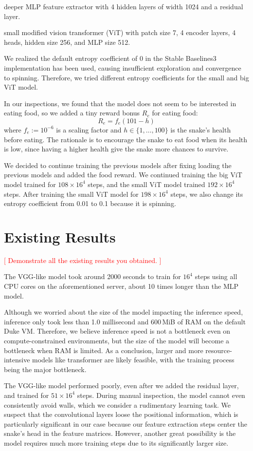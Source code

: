 \documentclass[a4paper]{article}
\newcommand{\todo}[1]{\textcolor{red}{[ #1 ]}}
\begin{document}
deeper MLP feature extractor with 4 hidden layers of width 1024 and a residual
layer.

small modified vision transformer (ViT) with patch size 7, 4 encoder layers,
4 heads, hidden size 256, and MLP size 512.

We realized the default entropy coefficient of 0 in the Stable Baselines3
implementation has been used,
causing insufficient exploration and convergence to spinning. Therefore,
we tried different entropy coefficients for the small and big ViT model.

In our inspections,
we found that the model does not seem to be interested in eating food,
so we added a tiny reward bonus $R_e$ for eating food:
$$
    R_e = f_e(101 - h)
$$
where $f_e:=10^{-6}$ is a scaling factor and $h\in\{1,\ldots,100\}$ is the
snake's health before eating.
The rationale is to encourage the snake to eat food when its health is low,
since having a higher health give the snake more chances to survive.

We decided to continue training the previous models after fixing loading the
previous models and added the food reward.
We continued training the big ViT model trained for $108\times 16^4$ steps,
and the small ViT model trained $192\times 16^4$ steps.
After training the small ViT model for $198\times 16^4$ steps,
we also change its entropy coefficient from 0.01 to 0.1 because it is spinning.

\section{Existing Results}

\todo{Demonstrate all the existing results you obtained.}

The VGG-like model took around 2000 seconds to train for $16^4$ steps using all
CPU cores on the aforementioned server,
about 10 times longer than the MLP model.

Although we worried about the size of the model impacting the inference speed,
inference only took less than 1.0 millisecond and 600\,MiB of RAM on the default
Duke VM. Therefore,
we believe inference speed is not a bottleneck even on compute-constrained
environments,
but the size of the model will become a bottleneck when RAM is limited.
As a conclusion,
larger and more resource-intensive models like transformer are likely feasible,
with the training process being the major bottleneck.

The VGG-like model performed poorly, even after we added the residual layer,
and trained for $51 \times 16^4$ steps. During manual inspection,
the model cannot even consistently avoid walls,
which we consider a rudimentary learning task.
We suspect that the convolutional layers loose the positional information,
which is particularly significant in our case because our feature extraction
steps center the snake's head in the feature matrices. However,
another great possibility is the model requires much more training steps due to
its significantly larger size.
\end{document}
